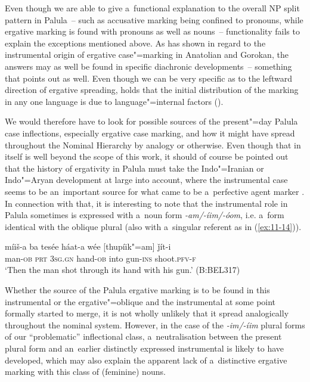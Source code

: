 Even though we are able to give a~functional explanation to the overall NP split pattern in Palula~-- such as accusative marking being confined to pronouns, while ergative marking is found with pronouns as well as nouns~-- functionality fails to explain the exceptions mentioned above. As \citet{garrett1990} has shown in regard to the instrumental origin of ergative case"=marking in Anatolian and Gorokan, the answers may as well be found in specific diachronic developments~-- something that \citet[93]{dixon1994} points out as well. Even though we can be very specific as to the leftward direction of ergative spreading, \citeauthor{garrett1990} holds that the initial distribution of the marking in any one language is due to language"=internal factors (\citeyear[286]{garrett1990}). 



We would therefore have to look for possible sources of the present"=day Palula case inflections, especially ergative case marking, and how it might have spread throughout the Nominal Hierarchy by analogy or otherwise. Even though that in itself is well beyond the scope of this work, it should of course be pointed out that the history of ergativity in Palula must take the Indo"=Iranian \citep[263--264]{garrett1990} or Indo"=Aryan \citep[341--346]{masica1991} development at large into account, where the instrumental case seems to be an~important source for what came to be a~perfective agent marker \citep[13]{skalmowski1985}. In connection with that, it is interesting to note that the instrumental role in Palula sometimes is expressed with a~noun form \textit{-am/-íim/-óom}, i.e. a~form identical with the oblique plural (also with a~singular referent as in (\ref{ex:11-14})).

\begin{exe}
\ex
\label{ex:11-14}
\gll míiš-a ba tesée háat-a wée [thupíik"=am] ǰít-i \\
man-\textsc{ob} \textsc{prt} \textsc{3sg.gn} hand-\textsc{ob} into gun-\textsc{ins} shoot.\textsc{pfv-f} \\
\glt `Then the man shot through its hand with his gun.' (B:BEL317)
\end{exe}

Whether the source of the Palula ergative marking is to be found in this instrumental or the ergative"=oblique and the instrumental at some point formally started to merge, it is not wholly unlikely that it spread analogically throughout the nominal system. However, in the case of the \textit{-im/-íim} plural forms of our ``problematic'' inflectional class, a~neutralisation between the present plural form and an~earlier distinctly expressed instrumental is likely to have developed, which may also explain the apparent lack of a~distinctive ergative marking with this class of (feminine) nouns.



